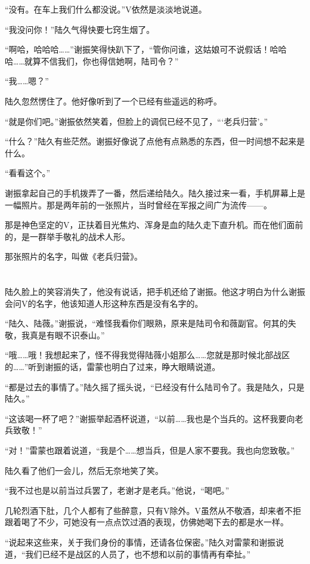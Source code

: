“没有。在车上我们什么都没说。”V依然是淡淡地说道。

“我没问你！”陆久气得快要七窍生烟了。

“啊哈，哈哈哈……”谢振笑得快趴下了，“管你问谁，这姑娘可不说假话！哈哈哈……就算不信我们，你也得信她啊，陆司令？”

“我……嗯？”

陆久忽然愣住了。他好像听到了一个已经有些遥远的称呼。

“就是你们吧。”谢振依然笑着，但脸上的调侃已经不见了，“‘老兵归营’。”

“什么？”陆久有些茫然。谢振好像说了点他有点熟悉的东西，但一时间想不起来是什么。

“看看这个。”

谢振拿起自己的手机拨弄了一番，然后递给陆久。陆久接过来一看，手机屏幕上是一幅照片。那是两年前的一张照片，当时曾经在军报之间广为流传——。

那是神色坚定的V，正扶着目光焦灼、浑身是血的陆久走下直升机。而在他们面前的，是一群举手敬礼的战术人形。

那张照片的名字，叫做《老兵归营》。

\section*{}

陆久脸上的笑容消失了，他没有说话，把手机还给了谢振。他这才明白为什么谢振会问V的名字，他该知道人形这种东西是没有名字的。

“陆久、陆薇。”谢振说，“难怪我看你们眼熟，原来是陆司令和薇副官。何其的失敬，我真是有眼不识泰山。”

“哦……哦！我想起来了，怪不得我觉得陆薇小姐那么……您就是那时候北部战区的……”听到谢振的话，雷蒙也明白了过来，睁大眼睛说道。

“都是过去的事情了。”陆久摇了摇头说，“已经没有什么陆司令了。我是陆久，只是陆久。”

“这该喝一杯了吧？”谢振举起酒杯说道，“以前……我也是个当兵的。这杯我要向老兵致敬！”

“对！”雷蒙也跟着说道，“我是个……想当兵，但是人家不要我。我也向您致敬。”

陆久看了他们一会儿，然后无奈地笑了笑。

“我不过也是以前当过兵罢了，老谢才是老兵。”他说，“喝吧。”

几轮烈酒下肚，几个人都有了些醉意，只有V除外。V虽然从不敬酒，却来者不拒跟着喝了不少，可她没有一点点饮过酒的表现，仿佛她喝下去的都是水一样。

“说起来这些来，关于我们身份的事情，还请各位保密。”陆久对雷蒙和谢振说道，“我们已经不是战区的人员了，也不想和以前的事情再有牵扯。”

